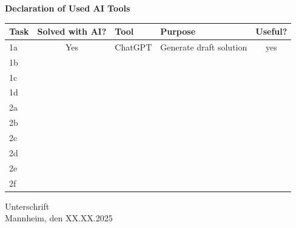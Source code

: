 \documentclass[a4paper,oneside,bibliography=totoc]{scrartcl}
\begin{document}
%
%
\begin{center}
  \textbf{Declaration of Used AI Tools} \\[.3em]
  \begin{tabularx}{\textwidth}{lclXc}
    \toprule
    Task & Solved with AI? & Tool & Purpose & Useful? \\
    \midrule
    1a & Yes & ChatGPT & Generate draft solution & yes \\
    1b \\
    1c \\
    1d \\
    2a \\
    2b \\
    2c \\
    2d \\
    2e \\
    2f \\
    \bottomrule
  \end{tabularx}
\end{center}

\vspace{2cm}
\noindent Unterschrift\\
\noindent Mannheim, den XX.XX.2025 \hfill
\end{document}
